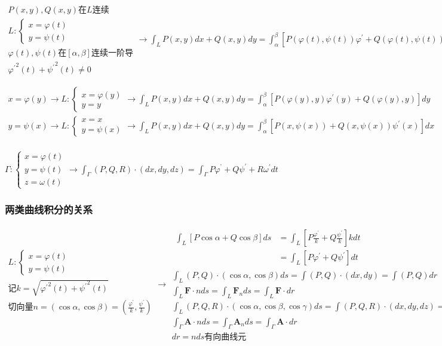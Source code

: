 \documentclass[UTF8]{ctexart}
\newcommand{\mt}[1]{\text{#1}}
\newcommand{\mb}[1]{\textbf{#1}}
\newcommand{\mf}[1]{\left( #1\right)}
\newcommand{\mfc}[1]{\left[ #1 \right]}
\newcommand{\ma}[1]{\begin{array}{llll} #1 \end{array}}
\newcommand{\fcz}[1] {
    \left\{
        \begin{array}{llll} #1 \end{array}
    \right.
}
\begin{document}
$\ma{
    P\mf{x,y},Q\mf{x,y}\mt{在}L\mt{连续}\\
    L:\fcz{x=\varphi\mf{t}\\y=\psi\mf{t}}\\
    \varphi\mf{t},\psi\mf{t}\mt{在}\mfc{\alpha,\beta}\mt{连续一阶导}\\
    {\varphi^{'}}^2\mf{t}+{\psi^{'}}^2\mf{t}\neq 0
}\rightarrow \int_L P\mf{x,y}dx+ Q\mf{x,y}dy=\int_\alpha^\beta \mfc{P\mf{\varphi\mf{t},\psi\mf{t}}\varphi^{'}+ Q\mf{\varphi\mf{t},\psi\mf{t}}\psi^{'}}dt$


$\ma{
    x=\varphi\mf{y} \rightarrow L:\fcz{x=\varphi\mf{y}\\y=y}\rightarrow 
     \int_L P\mf{x,y}dx+ Q\mf{x,y}dy=\int_\alpha^\beta \mfc{P\mf{\varphi\mf{y},y}\varphi^{'}\mf{y}+ Q\mf{\varphi\mf{y},y}}dy\\
    y=\psi\mf{x} \rightarrow L:\fcz{x=x\\y=\psi\mf{x}}\rightarrow
     \int_L P\mf{x,y}dx+ Q\mf{x,y}dy=\int_\alpha^\beta \mfc{P\mf{x,\psi\mf{x}}+ Q\mf{x,\psi\mf{x}}\psi^{'}\mf{x}}dx\\
}$

$\Gamma:\fcz{x=\varphi\mf{t}\\
y=\psi\mf{t}\\
z=\omega\mf{t}} \rightarrow \int_\Gamma \mf{P,Q,R}\cdot \mf{dx,dy,dz}=\int_\Gamma P \varphi^{’} +Q\psi^{'}+R\omega^{'}dt$

\subsubsection{两类曲线积分的关系}

\noindent
$\ma{L:\fcz{x=\varphi\mf{t}\\y=\psi\mf{t}}\\
\mt{记}k=\sqrt{{\varphi^{'}}^2\mf{t}+{\psi^{'}}^2\mf{t}}\\
\mt{切向量}n=\mf{\cos \alpha,\cos \beta}=\mf{\frac{\varphi^{'}}{k},\frac{\psi^{'}}{k}}\\
}\rightarrow \ma{\ma{
    \int_L\mfc{P\cos\alpha+Q\cos\beta}ds&=\int_L\mfc{P\frac{\varphi^{'}}{k}+Q\frac{\psi^{'}}{k}}kdt\\
    &=\int_L\mfc{P\varphi^{'}+Q\psi^{'}}dt
}\\
\int_L \mf{P,Q}\cdot\mf{\cos \alpha,\cos \beta}ds=\int \mf{P,Q} \cdot \mf{dx,dy}=\int \mf{P,Q} dr\\
\int_L \mb{F}\cdot n ds=\int_L \mb{F}_n ds=\int_L \mb{F} \cdot dr\\
\int_L \mf{P,Q,R}\cdot\mf{\cos \alpha,\cos \beta,\cos \gamma}ds=\int \mf{P,Q,R} \cdot \mf{dx,dy,dz}=\int \mf{P,Q,R} dr\\
\int_\Gamma \mb{A}\cdot n ds=\int_\Gamma \mb{A}_n ds=\int_\Gamma \mb{A} \cdot dr\\
dr=nds \mt{有向曲线元}
}$
\end{document}
